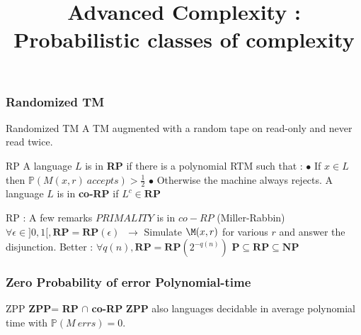 \documentclass[pdf]{beamer}
\newcommand{\bb}[1]{\mathbb{#1}}
\begin{document}
\title{Advanced Complexity : Probabilistic classes of complexity}

\begin{frame}
\maketitle
\end{frame}

\begin{frame}
\frametitle{Randomized TM}

\begin{block}{Randomized TM}
A TM augmented with a random tape on read-only and never read twice.
\end{block}

\begin{block}{RP}
A language $L$ is in \textbf{RP} if there is a polynomial RTM such that : \newline
$\bullet$ If $x \in L$ then $\bb{P}(M(x,r)~accepts)>\frac{1}{2}$ \newline
$\bullet$ Otherwise the machine always rejects. \newline
A language $L$ is in \textbf{co-RP} if $L^c \in \mathbf{RP}$
\end{block}

\begin{exampleblock}{RP : A few remarks}
$PRIMALITY$ is in $co-RP$ (Miller-Rabbin)\newline
$\forall \epsilon \in ]0,1[, \mathbf{RP}=\mathbf{RP}(\epsilon)$ \newline
$ ~\rightarrow$ Simulate $\M(x,r)$ for various $r$ and answer the disjunction. \newline
Better : $\forall q(n), \mathbf{RP}=\mathbf{RP}(2^{-q(n)})$ \newline
$\textbf{P} \subseteq  \textbf{RP} \subseteq \textbf{NP}$
\end{exampleblock}
\end{frame}

\begin{frame}
\frametitle{Zero Probability of error Polynomial-time}

\begin{block}{ZPP}
\textbf{ZPP}= \textbf{RP} $\cap$ \textbf{co-RP} \newline
\textbf{ZPP} also languages decidable in average polynomial time with $\bb{P}(M~errs)=0$.
\end{block}

\end{frame}
\end{document}
